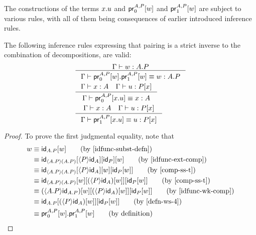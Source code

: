 The constructions of the terms $\ctxext{x}{u}$ and $\cprojfst{A}{P}{w}$ and
$\cprojsnd{A}{P}{w}$ are subject to various rules, with all of them being
consequences of earlier introduced inference rules.

\begin{lem} The following inference rules expressing that pairing is a strict
inverse to the combination of decompositions, are valid:
\begin{align*}
& \inference{\jterm{\Gamma}{\ctxext{A}{P}}{w}}{\jtermeq{\Gamma}{\ctxext{A}{P}}{\ctxext{\cprojfst{A}{P}{w}}{\cprojsnd{A}{P}{w}}}{w}}\\
& \inference{\jterm{\Gamma}{A}{x}\quad\jterm{\Gamma}{\subst{x}{P}}{u}}{\jtermeq{\Gamma}{A}{\cprojfst{A}{P}{\ctxext{x}{u}}}{x}}\\
& \inference{\jterm{\Gamma}{A}{x}\quad\jterm{\Gamma}{\subst{x}{P}}{u}}{\jtermeq{\Gamma}{\subst{x}{P}}{\cprojsnd{A}{P}{\ctxext{x}{u}}}{u}}
\end{align*}
\end{lem}

\begin{proof}
To prove the first judgmental equality, note that
\begin{align*}
w & \jdeq \subst{w}{\idfunc[\ctxext{A}{P}]} \tag{by \autoref{idfunc-subst-defn}}\\
& \jdeq \subst{w}{\subst{\idfunc[P]}{{\ctxwk{P}{\idfunc[A]}}{\idfunc[\ctxwk{\ctxext{A}{P}}{\ctxext{A}{P}}]}}}
  \tag{by \autoref{idfunc-ext-comp}}\\
& \jdeq \subst{{w}{\idfunc[P]}}{\subst{w}{{\ctxwk{P}{\idfunc[A]}}{\idfunc[\ctxwk{\ctxext{A}{P}}{\ctxext{A}{P}}]}}}\tag{by \autoref{comp-ss-t}}\\
& \jdeq \subst{{w}{\idfunc[P]}}{{\subst{w}{\ctxwk{P}{\idfunc[A]}}}{\subst{w}{\idfunc[\ctxwk{\ctxext{A}{P}}{\ctxext{A}{P}}]}}}\tag{by \autoref{comp-ss-t}}\\
& \jdeq \subst{{w}{\idfunc[P]}}{{\subst{w}{\ctxwk{P}{\idfunc[A]}}}{\subst{w}{\ctxwk{\ctxext{A}{P}}{\idfunc[\ctxext{A}{P}]}}}}\tag{by \autoref{idfunc-wk-comp}}\\
& \jdeq \subst{{w}{\idfunc[P]}}{{\subst{w}{\ctxwk{P}{\idfunc[A]}}}{\idfunc[\ctxext{A}{P}]}}\tag{by \autoref{defn-ws-4}}\\
& \jdeq \ctxext{\cprojfst{A}{P}{w}}{\cprojsnd{A}{P}{w}}\tag{by definition}
\end{align*}
\end{proof}

